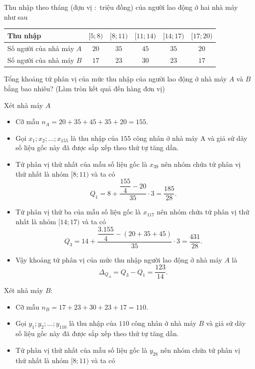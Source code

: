 \begin{bt}%
	Thu nhập theo tháng (đợn vị $\colon$ triệu đồng) của người lao động ở hai nhà máy như sau
	\begin{center}
		\begin{tabular}{|l|c|c|c|c|c|}
			\hline
			Thu nhập & {$[5; 8)$} & {$[8; 11)$} & {$[11; 14)$} & {$[14; 17)$} & {$[17; 20)$} \\
			\hline
			Số người của nhà 
				máy $A$
		& $20$ & $35$ & $45$ & $35$ & $20$ \\
			\hline
		 Số người của nhà 
				máy $B$
		 & $17$ & $23$ & $30$ & $23$ & $17$ \\
			\hline
		\end{tabular}
	\end{center}
	Tổng khoảng tứ phân vị của mức thu nhập của người lao động ở nhà máy $A$ và $B$ bằng bao nhiêu? (Làm tròn kết quả đến hàng đơn vị)
	\loigiai
{
			Xét nhà máy $A$
		\begin{itemize}
			\item 	Cỡ mẫu $n_A=20+35+45+35+20=155$.
				\item Gọi $x_1; x_2; \ldots; x_{155}$ là thu nhập của $155$ công nhân ở nhà máy A và giả sử dãy số liệu gốc này đã được sắp xếp theo thứ tự tăng dần.
			
			\item	Tứ phân vị thứ nhất của mẫu số liệu gốc là $x_{39}$ nên nhóm chứa tứ phân vị thứ nhất là nhóm $[8; 11)$ và ta có
			$$	Q_1=8+\dfrac{\dfrac{155}{4}-20}{35} \cdot 3=\dfrac{185}{28}.
			$$
		\item	Tứ phân vị thứ ba của mẫu số liệu gốc là $x_{117}$ nên nhóm chứa tứ phân vị thứ nhất là nhóm $[14; 17)$ và ta có
		$$
		Q_3=14+\dfrac{\dfrac{3.155}{4}-(20+35+45)}{35} \cdot 3=\dfrac{431}{28}.
		$$
		\item	Vậy khoảng tứ phân vị của mức thu nhập người lao động ở nhà máy $A$ là $$\Delta_{Q_A}=Q_3-Q_1=\dfrac{123}{14}.$$	
		\end{itemize}
	
		Xét nhà máy $B \colon$
		\begin{itemize}
		\item Cỡ mẫu $n_B=17+23+30+23+17=110$.
		\item Gọi $y_1; y_2; \ldots; y_{110}$ là thu nhập của $110$ công nhân ở nhà máy $B$ và giả sử dãy số liệu gốc này đã được sắp xếp theo thứ tự tăng dần.
		\item Tứ phân vị thứ nhất của mẫu số liệu gốc là $y_{28}$ nên nhóm chứa tứ phân vị thứ nhất là nhóm $[8; 11)$ và ta có 
	

\end{itemize}}
\end{bt}
